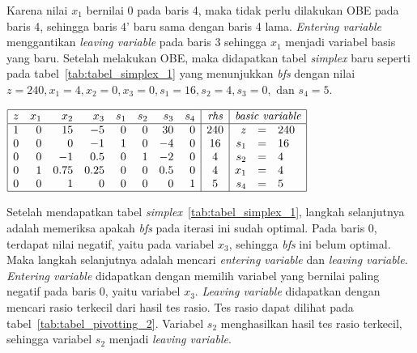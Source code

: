 Karena nilai \(x_1\) bernilai 0 pada baris 4, maka tidak perlu dilakukan OBE pada baris 4, sehingga baris 4' baru sama dengan baris 4 lama. \textit{Entering variable} menggantikan \textit{leaving variable} pada baris 3 sehingga \(x_1\) menjadi variabel basis yang baru. Setelah melakukan OBE, maka didapatkan tabel \textit{simplex} baru seperti pada tabel~\ref{tab:tabel_simplex_1} yang menunjukkan \textit{bfs} dengan nilai \(z=240, x_1=4, x_2=0, x_3=0, s_1=16, s_2=4, s_3=0, \text{ dan } s_4=5\).

\begin{center}
	\label{tab:tabel_simplex_1}
	$
	\begin{array}{|r r r r r r r r|c|r c l|}
		\hline
		z & x_1 & x_2 & x_3 & s_1 & s_2 & s_3 & s_4 & \textit{rhs} & \multicolumn{3}{c|}{\textit{basic variable}}\\
		\hline
		1 & 0 & 15 & -5 & 0 & 0 & 30 & 0 & 240 & z & = & 240\\
		0 & 0 & 0 & -1 & 1 & 0 & -4 & 0 & 16 & s_1 & = & 16\\
		0 & 0 & -1 & 0.5 & 0 & 1 & -2 & 0 & 4 & s_2 & = & 4\\
		0 & 1 & 0.75 & 0.25 & 0 & 0 & 0.5 & 0 & 4 & x_1 & = & 4\\
		0 & 0 & 1 & 0 & 0 & 0 & 0 & 1 & 5 & s_4 & = & 5\\
		\hline
	\end{array}
	$
\end{center}

Setelah mendapatkan tabel \textit{simplex}~\ref{tab:tabel_simplex_1}, langkah selanjutnya adalah memeriksa apakah \textit{bfs} pada iterasi ini sudah optimal. Pada baris 0, terdapat nilai negatif, yaitu pada variabel \(x_3\), sehingga \textit{bfs} ini belum optimal. Maka  langkah selanjutnya adalah mencari \textit{entering variable} dan \textit{leaving variable}. \textit{Entering variable} didapatkan dengan memilih variabel yang bernilai paling negatif pada baris 0, yaitu variabel \(x_3\). \textit{Leaving variable} didapatkan dengan mencari rasio terkecil dari hasil tes rasio. Tes rasio dapat dilihat pada tabel~\ref{tab:tabel_pivotting_2}. Variabel \(s_2\) menghasilkan hasil tes rasio terkecil, sehingga variabel \(s_2\) menjadi \textit{leaving variable}.

